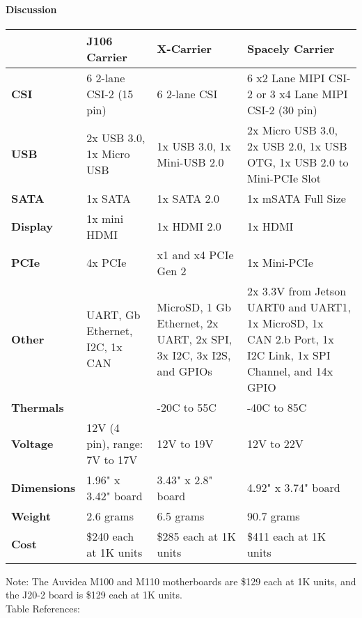 \paragraph{Discussion}

\begin{tabular}{|l|p{5cm}|p{5cm}|p{5cm}|}
	\hline
	\textbf{} & \textbf{J106 Carrier} & \textbf{X-Carrier} & \textbf{Spacely Carrier}\\
	\hline
	\textbf{CSI} & 6 2-lane CSI-2 (15 pin) & 6 2-lane CSI & 6 x2 Lane MIPI CSI-2 or 3 x4 Lane MIPI CSI-2 (30 pin)\\
	\hline
	\textbf{USB} & 2x USB 3.0, 1x Micro USB & 1x USB 3.0, 1x Mini-USB 2.0 & 2x Micro USB 3.0, 2x USB 2.0, 1x USB OTG, 1x USB 2.0 to Mini-PCIe Slot \\
	\hline
	\textbf{SATA} & 1x SATA & 1x SATA 2.0 & 1x mSATA Full Size \\
	\hline
	\textbf{Display} & 1x mini HDMI & 1x HDMI 2.0 & 1x HDMI \\
	\hline
	\textbf{PCIe} & 4x PCIe & x1 and x4 PCIe Gen 2 & 1x Mini-PCIe \\
	\hline
	\textbf{Other} & UART, Gb Ethernet, I2C, 1x CAN & MicroSD, 1 Gb Ethernet, 2x UART, 2x SPI, 3x I2C, 3x I2S, and GPIOs & 2x 3.3V from Jetson UART0 and UART1, 1x MicroSD, 1x CAN 2.b Port, 1x I2C Link, 1x SPI Channel, and 14x GPIO \\
	\hline
	\textbf{Thermals} &  & -20\degree C to 55\degree C & -40\degree C to 85\degree C \\
	\hline
	\textbf{Voltage} & 12V (4 pin), range: 7V to 17V & 12V to 19V & 12V to 22V \\
	\hline
	\textbf{Dimensions} & 1.96" x 3.42" board & 3.43" x 2.8" board & 4.92" x 3.74" board \\
	\hline
	\textbf{Weight} & 2.6 grams & 6.5 grams & 90.7 grams \\
	\hline
	\textbf{Cost} & \$240 each at 1K units & \$285 each at 1K units & \$411 each at 1K units \\
	\hline
\end{tabular}	
\newline
\newline
\newline
Note: The Auvidea M100 and M110 motherboards are \$129 each at 1K units, and the 
J20-2 board is \$129 each at 1K units. \\
Table References: \cite{AuvideaJ106, MouserJ106, CEIX, CEIXpdf, SpacelyUG, SpacelyQuote, CEIQuote, AuvideaQuote}\\

